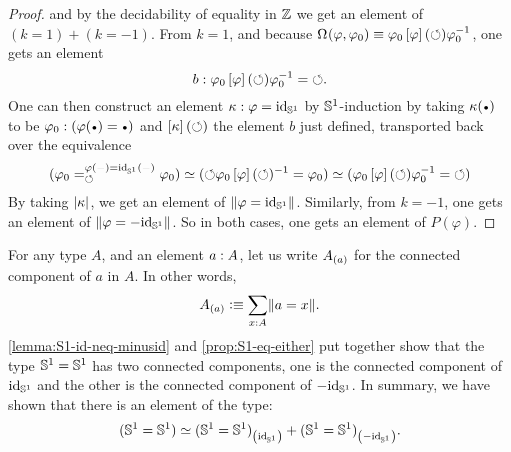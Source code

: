 \documentclass[english,a4paper]{lmcs}
\begin{document}
\begin{proof}
  and by the decidability of equality in $\mathbb{Z}$ we get an element of $(k=1)+(k=-1)$.
  From $k=1$, and because
  $\mathop{\Omega^{}} (\varphi,\varphi_0) \equiv \varphi_0
  \left[{\varphi}\right](\mathord{\circlearrowleft}) \varphi_0^{-1}$, one gets an element
  \begin{displaymath}
    b: \varphi_0 \left[{\varphi}\right](\mathord{\circlearrowleft}) \varphi_0^{-1} = \mathord{\circlearrowleft}.
  \end{displaymath}
  One can then construct an element $\kappa: \varphi = \mathord{\mathrm{id}}_{{\mathbb S^{1}}}$ by
  ${{\mathbb S^{1}}}$-induction by taking $\kappa(\base)$ to be
  $\varphi_0 \from (\varphi(\base) = \base)$ and $\left[{\kappa}\right](\mathord{\circlearrowleft})$
  the element $b$ just defined, transported back over the equivalence
  \begin{displaymath}
    (\pathover {\varphi_0} {\varphi(\blank) = \id_\Sc(\blank)} \Sloop {\varphi_0}) \weq
    ( \Sloop \varphi_0 \inv {\ap\varphi(\Sloop)} = \varphi_0)
    \weq (\varphi_0 \ap\varphi(\Sloop) \inv {\varphi_0} = \Sloop)
  \end{displaymath}
  By taking $\lvert\kappa\rvert$, we get an element of
  $\lVert\varphi = \mathord{\mathrm{id}}_{{\mathbb S^{1}}}\rVert$. Similarly, from $k=-1$, one gets an
  element of $\lVert\varphi = -\mathord{\mathrm{id}}_{{\mathbb S^{1}}}\rVert$. So in both cases, one gets
  an element of $P(\varphi)$.
\end{proof}

For any type $A$, and an element $a: A$, let us write ${A}_{\left(a\right)}$
for the connected component of $a$ in $A$. In other words,
\begin{displaymath}
  {A}_{\left(a\right)} \vcentcolon\equiv \sum_{x: A}\lVert a=x\rVert.
\end{displaymath}
\cref{lemma:S1-id-neq-minusid} and \cref{prop:S1-eq-either} put
together show that the type ${{\mathbb S^{1}}}={{\mathbb S^{1}}}$ has two connected components,
one is the connected component of $\mathord{\mathrm{id}}_{{\mathbb S^{1}}}$ and the other is the
connected component of $-\mathord{\mathrm{id}}_{{\mathbb S^{1}}}$. In summary, we have shown that
there is an element of the type:
\begin{displaymath}
  ({{\mathbb S^{1}}}={{\mathbb S^{1}}}) \simeq {({{\mathbb S^{1}}}={{\mathbb S^{1}}})}_{\left(\mathord{\mathrm{id}}_{{\mathbb S^{1}}}\right)} + {({{\mathbb S^{1}}}={{\mathbb S^{1}}})}_{\left(-\mathord{\mathrm{id}}_{{\mathbb S^{1}}}\right)}.
\end{displaymath}
\end{document}
